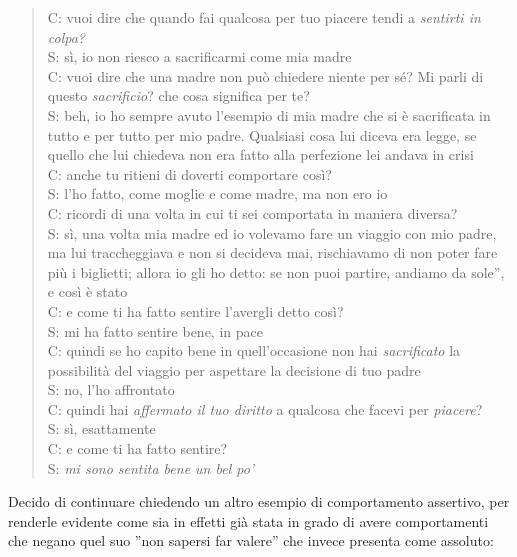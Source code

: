 \begin{verse}
C: vuoi dire che quando fai qualcosa per tuo piacere tendi a \emph{sentirti in colpa?}\\
S: sì, io non riesco a sacrificarmi come mia madre\\
C: vuoi dire che una madre non può chiedere niente per sé? Mi parli di questo \emph{sacrificio}? che cosa significa per te?\\
S: beh, io ho sempre avuto l'esempio di mia madre che si è sacrificata in tutto e per tutto per mio padre. Qualsiasi cosa lui diceva era legge, se quello che lui chiedeva non era fatto alla perfezione lei andava in crisi\\
C: anche tu ritieni di doverti comportare così?\\
S: l'ho fatto, come moglie e come madre, ma non ero io\\
C: ricordi di una volta in cui ti sei comportata in maniera diversa?\\
S: sì, una volta mia madre ed io volevamo fare un viaggio con mio padre, ma lui traccheggiava e non si decideva mai, rischiavamo di non poter fare più i biglietti; allora io gli ho detto: se non puoi partire, andiamo da sole'', e così è stato\\
C: e come ti ha fatto sentire l'avergli detto così?\\
S: mi ha fatto sentire bene, in pace\\
C: quindi se ho capito bene in quell'occasione non hai \emph{sacrificato} la possibilità del viaggio per aspettare la decisione di tuo padre\\
S: no, l'ho affrontato\\
C: quindi hai \emph{affermato il tuo diritto} a qualcosa che facevi per \emph{piacere}?\\
S: sì, esattamente\\
C: e come ti ha fatto sentire?\\
S: \emph{mi sono sentita bene un bel po'}%
\end{verse} 

\noindent Decido di continuare chiedendo un altro esempio di comportamento assertivo, per renderle evidente come sia in effetti già stata in grado di avere comportamenti che negano quel suo ''non sapersi far valere'' che invece presenta come assoluto:

